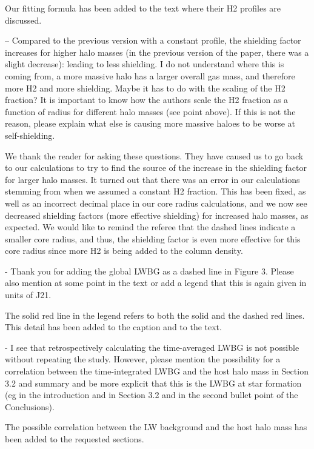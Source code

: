 \documentclass[11pt]{article}
\newenvironment{referee}[1][]{%
    \ignorespaces%
    \begin{mdframed}[style=myquotestyle,#1]%
}{%
    \end{mdframed}%
    \ignorespacesafterend%
}%
\begin{document}
    Our fitting formula has been added to the text where their H2 profiles are discussed.


\begin{referee}
    -- Compared to the previous version with a constant profile, the shielding factor increases for higher halo masses (in the previous version of the paper, there was a slight decrease): leading to less shielding. I do not understand where this is coming from, a more massive halo has a larger overall gas mass, and therefore more H2 and more shielding. Maybe it has to do with the scaling of the H2 fraction?  It is important to know how the authors scale the H2 fraction as a function of radius for different halo masses (see point above). If this is not the reason, please explain what else is causing more massive haloes to be worse at self-shielding.  
\end{referee}
    We thank the reader for asking these questions. They have caused us to go back to our calculations to try to find the source of the increase in the shielding factor for larger halo masses. It turned out that there was an error in our calculations stemming from when we assumed a constant H2 fraction. This has been fixed, as well as an incorrect decimal place in our core radius calculations, and we now see decreased shielding factors (more effective shielding) for increased halo masses, as expected. We would like to remind the referee that the dashed lines indicate a smaller core radius, and thus, the shielding factor is even more effective for this core radius since more H2 is being added to the column density. 

\begin{referee}
    - Thank you for adding the global LWBG as a dashed line in Figure 3. Please also mention at some point in the text or add a legend that this is again given in units of J21. 
\end{referee}
    The solid red line in the legend refers to both the solid and the dashed red lines. This detail has been added to the caption and to the text. 

\begin{referee}
    - I see that retrospectively calculating the time-averaged LWBG is not possible without repeating the study. However, please mention the possibility for a correlation between the time-integrated LWBG and the host halo mass in Section 3.2 and summary and be more explicit that this is the LWBG at star formation (eg in the introduction and in Section 3.2 and in the second bullet point of the Conclusions).  
\end{referee}
    The possible correlation between the LW background and the host halo mass has been added to the requested sections.
\end{document}

